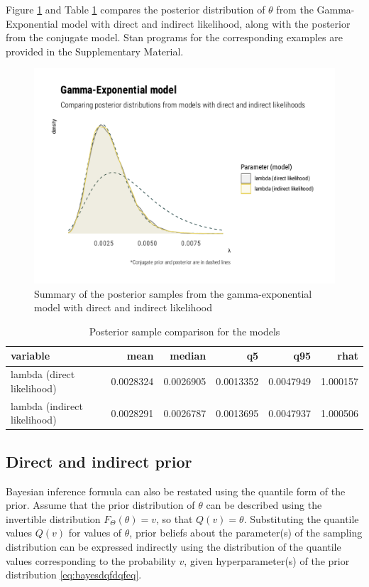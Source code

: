 \documentclass[
  12pt,
]{article}
\begin{document}
Figure \ref{fig:gexp-likelihood-graphs} and Table \ref{tab:gexp-likelihood-tab} compares the posterior distribution of \(\theta\) from the Gamma-Exponential model with direct and indirect likelihood, along with the posterior from the conjugate model. Stan programs for the corresponding examples are provided in the Supplementary Material.

\begin{figure}

{\centering \includegraphics[width=0.5\linewidth]{ilbm_article_files/figure-latex/gexp-likelihood-graphs-1} 

}

\caption{Summary of the posterior samples from the gamma-exponential model with direct and indirect likelihood}\label{fig:gexp-likelihood-graphs}
\end{figure}

\begin{table}[!h]

\caption{\label{tab:gexp-likelihood-tab}Posterior sample comparison for the models}
\centering
\begin{tabular}[t]{lrrrrr}
\toprule
variable & mean & median & q5 & q95 & rhat\\
\midrule
lambda (direct likelihood) & 0.0028324 & 0.0026905 & 0.0013352 & 0.0047949 & 1.000157\\
lambda (indirect likelihood) & 0.0028291 & 0.0026787 & 0.0013695 & 0.0047937 & 1.000506\\
\bottomrule
\end{tabular}
\end{table}

\hypertarget{direct-and-indirect-prior}{%
\subsection{Direct and indirect prior}\label{direct-and-indirect-prior}}

Bayesian inference formula can also be restated using the quantile form of the prior. Assume that the prior distribution of \(\theta\) can be described using the invertible distribution \(F_\Theta(\theta)=v\), so that \(Q(v)=\theta\). Substituting the quantile values \(Q(v)\) for values of \(\theta\), prior beliefs about the parameter(s) of the sampling distribution can be expressed indirectly using the distribution of the quantile values corresponding to the probability \(v\), given hyperparameter(s) of the prior distribution \eqref{eq:bayesdqfdqfeq}.
\end{document}
